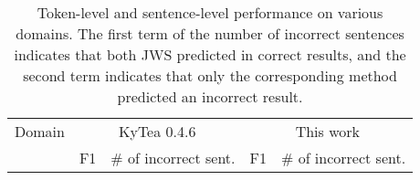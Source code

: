 \documentclass[11pt,letterpaper]{article}
\begin{document}
\begin{table*}[t]   
                                                                                                                                                                                                                                                                                                
 \begin{center}                                                                                                                                                                                                                                                                                                             
\caption{Token-level and sentence-level performance on various domains. The first term of the number of incorrect sentences indicates that both JWS predicted in correct results, and the second term indicates that only the corresponding method predicted an incorrect result. }                                                                                                                                                                                                                                                                                 
\label{error}                                                                                                                                                                                                                                                                                                              
 \begin{tabular}{p{53mm}|r|r|r|r}                                                                                                                                  
  \toprule                                                                                                                                                    
        \multicolumn{1}{c|}{Domain} & \multicolumn{2}{c|}{KyTea 0.4.6} & \multicolumn{2}{c}{This work} \\   \cline{2-5}
        \multicolumn{1}{c|}{} & \multicolumn{1}{c|}{F1} & \multicolumn{1}{c|}{\# of incorrect sent.} & \multicolumn{1}{c|}{F1} & \multicolumn{1}{c}{\# of incorrect sent.} \\   

\end{tabular}
\end{center}
\end{table*}
\end{document}
